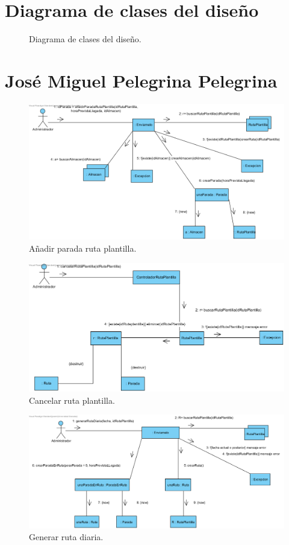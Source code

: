 \documentclass[12pt,spanish]{article}
\begin{document}
\section{Diagrama de clases del diseño}

\begin{figure}[H]
\centering
\caption{Diagrama de clases del diseño.}
\end{figure}

\section{José Miguel Pelegrina Pelegrina}

\begin{figure}[H]
\centering
\includegraphics[scale=0.5]{aniadirParadaRutaPlantilla.png}
\caption{Añadir parada ruta plantilla.}
\end{figure}

\begin{figure}[H]
\centering
\includegraphics[scale=0.5]{cancelarRutaPlantilla.png}
\caption{Cancelar ruta plantilla.}
\end{figure}

\begin{figure}[H]
\centering
\includegraphics[scale=0.5]{generarRutaDiaria.png}
\caption{Generar ruta diaria.}
\end{figure}
\end{document}
